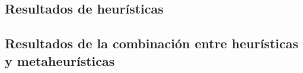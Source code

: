 


\subsection{Resultados de heurísticas}

\subsection{Resultados de la combinación entre heurísticas y metaheurísticas}

